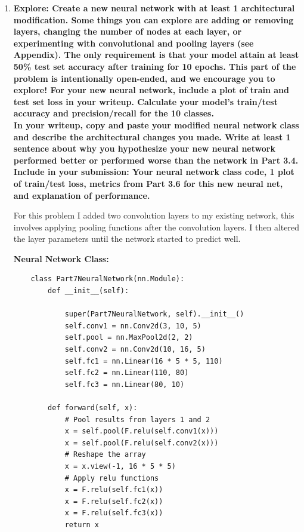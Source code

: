 \documentclass[submit]{harvardml}
\begin{document}
\begin{enumerate}
    \item \textbf{Explore: Create a new neural network with at least 1 architectural modification. Some things you can explore are adding or removing layers, changing the number of nodes at each layer, or experimenting with convolutional and pooling layers (see Appendix). The only requirement is that your model attain at least 50\% test set accuracy after training for 10 epochs. This part of the problem is intentionally open-ended, and we encourage you to explore!
    For your new neural network, include a plot of train and test set loss in your writeup. Calculate your model's train/test accuracy and precision/recall for the 10 classes.\\
    In your writeup, copy and paste your modified neural network class and describe the architectural changes you made. Write at least 1 sentence about why you hypothesize your new neural network performed better or performed worse than the network in Part 3.4. \\
    Include in your submission: Your neural network class code, 1 plot of train/test loss, metrics from Part 3.6 for this new neural net, and explanation of performance.}
    
    For this problem I added two convolution layers to my existing network, this involves applying pooling functions after the convolution layers. I then altered the layer parameters until the network started to predict well. 
    
    \textbf{Neural Network Class:}
    \begin{lstlisting}
    class Part7NeuralNetwork(nn.Module):
        def __init__(self):
            
            super(Part7NeuralNetwork, self).__init__()
            self.conv1 = nn.Conv2d(3, 10, 5)
            self.pool = nn.MaxPool2d(2, 2)
            self.conv2 = nn.Conv2d(10, 16, 5)
            self.fc1 = nn.Linear(16 * 5 * 5, 110)
            self.fc2 = nn.Linear(110, 80)
            self.fc3 = nn.Linear(80, 10)
    
        def forward(self, x):
            # Pool results from layers 1 and 2
            x = self.pool(F.relu(self.conv1(x)))
            x = self.pool(F.relu(self.conv2(x)))
            # Reshape the array
            x = x.view(-1, 16 * 5 * 5)
            # Apply relu functions
            x = F.relu(self.fc1(x))
            x = F.relu(self.fc2(x))
            x = F.relu(self.fc3(x))
            return x
    \end{lstlisting}
    

\end{enumerate}
\end{document}

